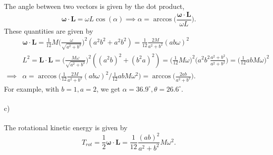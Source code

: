 \documentclass{article}
\begin{document}
        The angle between two vectors is given by the dot product,
        \begin{equation*}
            \boldsymbol \omega \cdot \mathbf{L} = \omega L \cos(\alpha) \implies \alpha = \arccos\bigg( \frac{\boldsymbol \omega \cdot \mathbf{L}}{\omega L}\bigg).
        \end{equation*}
        These quantities are given by
        \begin{align*}
            &\boldsymbol \omega \cdot \mathbf{L}  = \frac{1}{12} M \bigg( \frac{\omega}{\sqrt{a^2 + b^2}}\bigg)^2 (a^2b^2 + a^2b^2) = \frac{1}{12}\frac{2M}{a^2+ b^2} ( ab\omega)^2 \\
            &L^2 = \mathbf{L} \cdot \mathbf{L} = \bigg(\frac{M \omega}{\sqrt{a^2 + b^2}}\bigg)^2 ((a^2b)^2 + (b^2a)^2) = \bigg( \frac{1}{12}M \omega\bigg)^2 \bigg( a^2b^2\frac{a^2 + b^2}{a^2 + b^2}\bigg) = \bigg( \frac{1}{12} abM\omega \bigg)^2 \\
        \implies & \alpha = \arccos \bigg( 
            \frac{1}{12}\frac{2M}{a^2+ b^2} ( ab\omega)^2 \bigg/ \frac{1}{12} abM\omega^2 \bigg)
            = \arccos\bigg(\frac{2ab}{a^2 + b^2}\bigg).
        \end{align*}
        For example, with $b=1, a=2$, we get $\alpha = 36.9^\circ, \theta = 26.6^\circ$.
        \\ \\
        c) 
        \\ \\
        The rotational kinetic energy is given by 
        \begin{equation*}
            T_{rot} = \frac{1}{2} \boldsymbol \omega \cdot \mathbf{L} = \frac{1}{12}\frac{( ab)^2}{a^2+ b^2} M \omega^2.
    \end{equation*}
\end{document}
